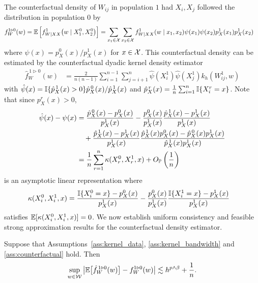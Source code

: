The counterfactual density of
$W_{i j}$ in population $1$
had $X_i, X_j$
followed the distribution in population $0$ by
%
\begin{align*}
  f_W^{1 \triangleright 0}(w)
  &=
  \E\left[
    f_{W \mid XX}^1\big(w \mid X_1^0, X_2^0\big)
  \right]
  = \sum_{x_1 \in \cX}
  \sum_{x_2 \in \cX}
  f_{W \mid XX}^{1}(w \mid x_1, x_2)
  \psi(x_1)
  \psi(x_2)
  p_X^{1}(x_1)
  p_X^{1}(x_2)
\end{align*}
%
where $\psi(x) = p_X^0(x)/p_X^1(x)$ for $x \in \cX$.
This counterfactual density can be estimated by
the counterfactual dyadic kernel density estimator
%
\begin{align*}
  \hat f_W^{\,1 \triangleright 0}(w)
  &=
  \frac{2}{n(n-1)}
  \sum_{i=1}^{n-1}
  \sum_{j=i+1}^n
  \hat \psi(X_i^1)
  \hat \psi(X_j^1)
  k_h(W_{i j}^1, w)
\end{align*}
%
with
$\hat\psi(x) =
\I\{\hat p_X^{\,1}(x) > 0\}\hat p_X^{\,0}(x) / \hat p_X^{\,1}(x)$
and $\hat p_X^{\,r}(x) = \frac{1}{n}\sum_{i = 1}^n \I\{X_i^r = x\}$.
Note that since $p_X^r(x) > 0$,
%
\begin{align*}
  \hat\psi(x) - \psi(x)
  &=
  \frac{\hat p_X^{\,0}(x) - p_X^0(x)}{p_X^1(x)}
  - \frac{p_X^0(x)}{p_X^1(x)}
  \frac{\hat p_X^{\,1}(x) - p_X^1(x)}{p_X^1(x)} \\
  &\quad+
  \frac{\hat p_X^{\,1}(x) - p_X^1(x)}{p_X^1(x)}
  \frac{\hat p_X^{\,1}(x) p_X^0(x) - \hat p_X^{\,0}(x)p_X^1(x)}
  {\hat p_X^{\,1}(x) p_X^1(x)} \\
  &=
  \frac{1}{n}
  \sum_{r=1}^n \kappa(X_r^0, X_r^1, x)
  + O_\P\left(\frac{1}{n}\right)
\end{align*}
%
is an asymptotic linear representation where
%
\begin{align*}
  \kappa(X_i^0, X_i^1, x)
  &=
  \frac{\I\{X_i^0 = x\} - p_X^0(x)}{p_X^1(x)}
  - \frac{p_X^0(x)}{p_X^1(x)}
  \frac{\I\{X_i^1 = x\} - p_X^1(x)}{p_X^1(x)}
\end{align*}
%
satisfies
$\E[\kappa(X_i^0, X_i^1, x)] = 0$.
We now establish uniform consistency and feasible strong
approximation results for the counterfactual density estimator.

\begin{lemma}
  \label{lem:counterfactual_bias}

  Suppose that Assumptions~\ref{ass:kernel_data},
  \ref{ass:kernel_bandwidth} and \ref{ass:counterfactual} hold.
  Then
  \begin{align*}
    \sup_{w \in \cW}
    \big|
    \E\big[\hat f_W^{\,1 \triangleright 0}(w)\big]
    - f_W^{1 \triangleright 0}(w)
    \big|
    \lesssim
    h^{p \wedge \beta} + \frac{1}{n}.
  \end{align*}

\end{lemma}

